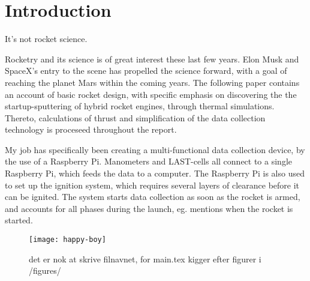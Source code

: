 \chapter{Introduction}

It's not rocket science.

Rocketry and its science is of great interest these last few years. Elon Musk and SpaceX's entry to the scene has propelled the science forward, with a goal of reaching the planet Mars within the coming years. The following paper contains an account of basic rocket design, with specific emphasis on discovering the the startup-sputtering of hybrid rocket engines, through thermal simulations. Thereto, calculations of thrust and simplification of the data collection technology is proceseed throughout the report.

My job has specifically been creating a multi-functional data collection device, by the use of a Raspberry Pi. Manometers and LAST-cells all connect to a single Raspberry Pi, which feeds the data to a computer. The Raspberry Pi is also used to set up the ignition system, which requires several layers of clearance before it can be ignited. The system starts data collection as soon as the rocket is armed, and accounts for all phases during the launch, eg. mentions when the rocket is started.

\begin{figure}
\texttt{[image: happy-boy]}
\caption{det er nok at skrive filnavnet, for main.tex kigger efter figurer i /figures/}
\label{fig:yyy}
\end{figure}
